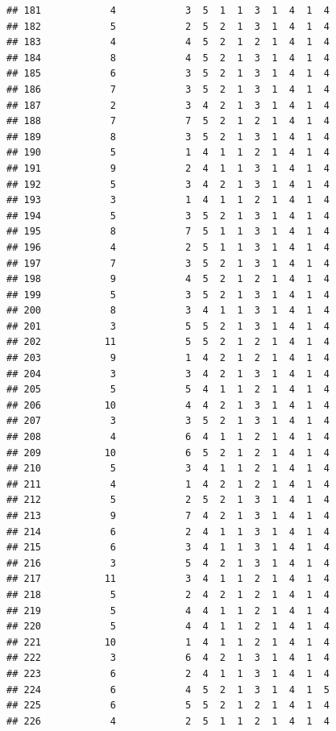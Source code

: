 \documentclass[12pt,]{krantz}
\theoremstyle{definition}
\theoremstyle{definition}
\theoremstyle{remark}
\begin{document}
\begin{verbatim}
## 181            4            3  5  1  1  3  1  4  1  4
## 182            5            2  5  2  1  3  1  4  1  4
## 183            4            4  5  2  1  2  1  4  1  4
## 184            8            4  5  2  1  3  1  4  1  4
## 185            6            3  5  2  1  3  1  4  1  4
## 186            7            3  5  2  1  3  1  4  1  4
## 187            2            3  4  2  1  3  1  4  1  4
## 188            7            7  5  2  1  2  1  4  1  4
## 189            8            3  5  2  1  3  1  4  1  4
## 190            5            1  4  1  1  2  1  4  1  4
## 191            9            2  4  1  1  3  1  4  1  4
## 192            5            3  4  2  1  3  1  4  1  4
## 193            3            1  4  1  1  2  1  4  1  4
## 194            5            3  5  2  1  3  1  4  1  4
## 195            8            7  5  1  1  3  1  4  1  4
## 196            4            2  5  1  1  3  1  4  1  4
## 197            7            3  5  2  1  3  1  4  1  4
## 198            9            4  5  2  1  2  1  4  1  4
## 199            5            3  5  2  1  3  1  4  1  4
## 200            8            3  4  1  1  3  1  4  1  4
## 201            3            5  5  2  1  3  1  4  1  4
## 202           11            5  5  2  1  2  1  4  1  4
## 203            9            1  4  2  1  2  1  4  1  4
## 204            3            3  4  2  1  3  1  4  1  4
## 205            5            5  4  1  1  2  1  4  1  4
## 206           10            4  4  2  1  3  1  4  1  4
## 207            3            3  5  2  1  3  1  4  1  4
## 208            4            6  4  1  1  2  1  4  1  4
## 209           10            6  5  2  1  2  1  4  1  4
## 210            5            3  4  1  1  2  1  4  1  4
## 211            4            1  4  2  1  2  1  4  1  4
## 212            5            2  5  2  1  3  1  4  1  4
## 213            9            7  4  2  1  3  1  4  1  4
## 214            6            2  4  1  1  3  1  4  1  4
## 215            6            3  4  1  1  3  1  4  1  4
## 216            3            5  4  2  1  3  1  4  1  4
## 217           11            3  4  1  1  2  1  4  1  4
## 218            5            2  4  2  1  2  1  4  1  4
## 219            5            4  4  1  1  2  1  4  1  4
## 220            5            4  4  1  1  2  1  4  1  4
## 221           10            1  4  1  1  2  1  4  1  4
## 222            3            6  4  2  1  3  1  4  1  4
## 223            6            2  4  1  1  3  1  4  1  4
## 224            6            4  5  2  1  3  1  4  1  5
## 225            6            5  5  2  1  2  1  4  1  4
## 226            4            2  5  1  1  2  1  4  1  4

\end{verbatim}
\end{document}

